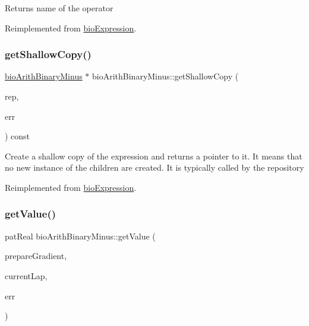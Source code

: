 \begin{DoxyReturn}{Returns}
name of the operator 
\end{DoxyReturn}


Reimplemented from \hyperlink{classbio_expression_a2353a4afb3a2b0af7c63aba086a72bde}{bio\+Expression}.

\mbox{\label{classbio_arith_binary_minus_a93db7cf10d0bdabd9c2b89544d767e6c}} 
\subsubsection{\texorpdfstring{get\+Shallow\+Copy()}{getShallowCopy()}}
{\footnotesize\ttfamily \hyperlink{classbio_arith_binary_minus}{bio\+Arith\+Binary\+Minus} $\ast$ bio\+Arith\+Binary\+Minus\+::get\+Shallow\+Copy (\begin{DoxyParamCaption}\item[{\hyperlink{classbio_expression_repository}{bio\+Expression\+Repository} $\ast$}]{rep,  }\item[{pat\+Error $\ast$\&}]{err }\end{DoxyParamCaption}) const\hspace{0.3cm}{\ttfamily [virtual]}}

Create a shallow copy of the expression and returns a pointer to it. It means that no new instance of the children are created. It is typically called by the repository 

Reimplemented from \hyperlink{classbio_expression_a442534762693b92baaf33928979a1bf8}{bio\+Expression}.

\mbox{\label{classbio_arith_binary_minus_a0a30a984e72adb63304f75c0c53552f9}} 
\subsubsection{\texorpdfstring{get\+Value()}{getValue()}}
{\footnotesize\ttfamily pat\+Real bio\+Arith\+Binary\+Minus\+::get\+Value (\begin{DoxyParamCaption}\item[{pat\+Boolean}]{prepare\+Gradient,  }\item[{pat\+U\+Long}]{current\+Lap,  }\item[{pat\+Error $\ast$\&}]{err }\end{DoxyParamCaption})\hspace{0.3cm}{\ttfamily [virtual]}}

